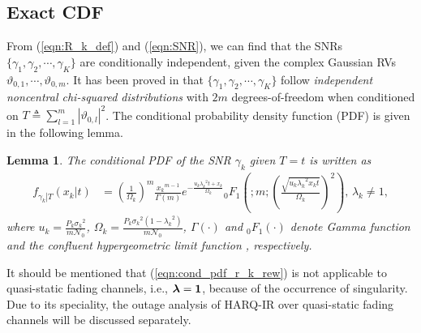 \documentclass[12pt,onecolumn,draftcls]{IEEEtran}
\newcommand{\bs}{\boldsymbol}
\newtheorem{lemma}{Lemma}
\begin{document}
\subsection{Exact CDF}
From (\ref{eqn:R_k_def}) and (\ref{eqn:SNR}), we can find that the SNRs $\{\gamma _1,\gamma _2,\cdots,\gamma _K\}$ are conditionally independent, given the complex Gaussian RVs ${\vartheta_{0,1}},\cdots,{\vartheta_{0,m}}$. It has been proved in \cite[Theorem 1.3.4]{muirhead2009aspects} that $\{\gamma _1,\gamma _2,\cdots,\gamma _K\}$ follow \emph{independent noncentral chi-squared distributions} with $2m$ degrees-of-freedom when conditioned on $T \triangleq \sum\nolimits_{l = 1}^m {{{\left| {\vartheta_{0,l}} \right|}^2}} $. The conditional probability density function (PDF) is given in the following lemma.
\begin{lemma}\cite[Theorem 1.3.4]{muirhead2009aspects}
The conditional PDF of the SNR $\gamma_k$ given $T =t$ is written as
\begin{align}\label{eqn:cond_pdf_r_k_rew}
{{f_{\left. {{\gamma _k}} \right|T}}\left( {\left. {{x_k}} \right|t} \right)} &{ = {{\left( {\frac{1}{{{\Omega _k}}}} \right)}^m}\frac{{{x_k}^{m - 1}}}{{\Gamma \left( m \right)}}{e^{ - \frac{{{u_k}{\lambda _k}^2t + {x_k}}}{{{\Omega _k}}}}}_0{F_1}\left( {;m;{{\left( {\frac{{\sqrt {{u_k}{\lambda _k}^2{x_k}t} }}{{{\Omega _k}}}} \right)}^2}} \right),}\,  {{\lambda _k}} \ne 1,
\end{align}
where ${u_k} = \frac{{P_k}{\sigma _k}^2}{m\mathcal N_0}$, $\Omega _k = \frac{{P_k}{\sigma _k}^2\left( {1 - {\lambda _k}^2} \right)}{m\mathcal N_0}$,  $\Gamma(\cdot)$ and ${}_0F_1(\cdot)$ denote Gamma function and the confluent hypergeometric limit function \cite[Eq.16.2.1]{olver2010nist}, respectively.
\end{lemma}
It should be mentioned that (\ref{eqn:cond_pdf_r_k_rew}) is not applicable to quasi-static fading channels, i.e., $\bs \lambda = \bf 1$, because of the occurrence of singularity. Due to its speciality, the outage analysis of HARQ-IR over quasi-static fading channels will be discussed separately. %
\end{document}
